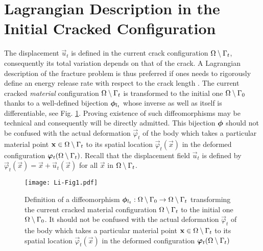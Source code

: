 \section{Lagrangian Description in the Initial Cracked Configuration} \label{sec:initialconfiguration}
The displacement $\vec{u}_t$ is defined in the current crack configuration ${\Omega\setminus\Gamma_t}$, consequently its total variation depends on that of the crack. A Lagrangian description of the fracture problem is thus preferred if ones needs to rigorously define an energy release rate with respect to the crack length \cite{Destuynder:1981}. The current cracked \emph{material} configuration ${\Omega\setminus\Gamma_t}$ is transformed to the initial one ${\Omega\setminus\Gamma_0}$ thanks to a well-defined bijection $\philt_{l_t}$ whose inverse as well as itself is differentiable, see Fig. \ref{fig:philt}. Proving existence of such diffeomorphisms may be technical \cite{KhludnevSokolowskiSzulc:2010} and consequently will be directly admitted. This bijection $\philt$ should not be confused with the actual deformation $\vec{\varphi}_t$ of the body which takes a particular material point $\vec{x}\in\domaint$ to its spatial location $\vec{\varphi}_t(\vec{x})$ in the deformed configuration $\vec{\varphi}_t(\domaint)$. Recall that the displacement field $\vec{u}_t$ is defined by $\vec{\varphi}_t(\vec{x})=\vec{x}+\vec{u}_t(\vec{x})$ for all $\vec{x}$ in ${\Omega\setminus\Gamma_t}$.
\begin{figure}[htbp]
\centering
\texttt{[image: Li-Fig1.pdf]}
\caption{Definition of a diffeomorphism $\philt_{l_t}:\domaini\to\domaint$ transforming the current cracked material configuration ${\Omega\setminus\Gamma_t}$ to the initial one ${\Omega\setminus\Gamma_0}$. It should not be confused with the actual deformation $\vec{\varphi}_t$ of the body which takes a particular material point $\vec{x}\in\domaint$ to its spatial location $\vec{\varphi}_t(\vec{x})$ in the deformed configuration $\vec{\varphi}_t(\domaint)$} \label{fig:philt}
\end{figure}


